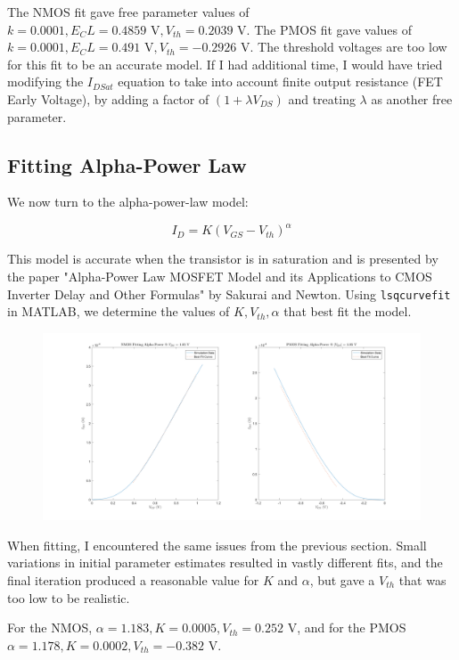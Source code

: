 \documentclass[11pt]{article}
\begin{document}
The NMOS fit gave free parameter values of $k = 0.0001, E_C L = 0.4859 \text{ V}, V_{th} = 0.2039 \text{ V}$. The PMOS fit gave values of $k = 0.0001, E_C L = 0.491 \text { V}, V_{th} = -0.2926 \text{ V}$. The threshold voltages are too low for this fit to be an accurate model. If I had additional time, I would have tried modifying the $I_{DSat}$ equation to take into account finite output resistance (FET Early Voltage), by adding a factor of $(1 + \lambda V_{DS})$ and treating $\lambda$ as another free parameter.

\subsection{Fitting Alpha-Power Law}
We now turn to the alpha-power-law model:

\begin{equation*}
	I_D = K(V_{GS} - V_{th}) ^ \alpha
\end{equation*}

This model is accurate when the transistor is in saturation and is presented by the paper "Alpha-Power Law MOSFET Model and its Applications to CMOS Inverter Delay and Other Formulas" by Sakurai and Newton. Using \verb|lsqcurvefit| in MATLAB, we determine the values of $K, V_{th}, \alpha$ that best fit the model.

\begin{figure}[H]
	\centerline{\includegraphics[width=\textwidth]{images/alpha_power_fit.png}}
\end{figure}

When fitting, I encountered the same issues from the previous section. Small variations in initial parameter estimates resulted in vastly different fits, and the final iteration produced a reasonable value for $K$ and $\alpha$, but gave a $V_{th}$ that was too low to be realistic.

For the NMOS, $\alpha = 1.183, K = 0.0005, V_{th} = 0.252 \text{ V}$, and for the PMOS $\alpha = 1.178, K = 0.0002, V_{th} = -0.382 \text{ V}$. 
\end{document}

